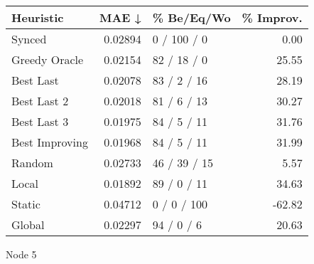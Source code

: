 \begin{tabular}{lrlr}
\toprule
\textbf{Heuristic} & \textbf{MAE ↓} & \textbf{\% Be/Eq/Wo} & \textbf{\% Improv.} \\
\midrule
            Synced &        0.02894 &          0 / 100 / 0 &                0.00 \\
     Greedy Oracle &        0.02154 &          82 / 18 / 0 &               25.55 \\
         Best Last &        0.02078 &          83 / 2 / 16 &               28.19 \\
       Best Last 2 &        0.02018 &          81 / 6 / 13 &               30.27 \\
       Best Last 3 &        0.01975 &          84 / 5 / 11 &               31.76 \\
    Best Improving &        0.01968 &          84 / 5 / 11 &               31.99 \\
            Random &        0.02733 &         46 / 39 / 15 &                5.57 \\
             Local &        0.01892 &          89 / 0 / 11 &               34.63 \\
            Static &        0.04712 &          0 / 0 / 100 &              -62.82 \\
            Global &        0.02297 &           94 / 0 / 6 &               20.63 \\
\bottomrule
\end{tabular}
\caption{Node 5}
\label{tab:non_lr01_le2_bs4_5}
